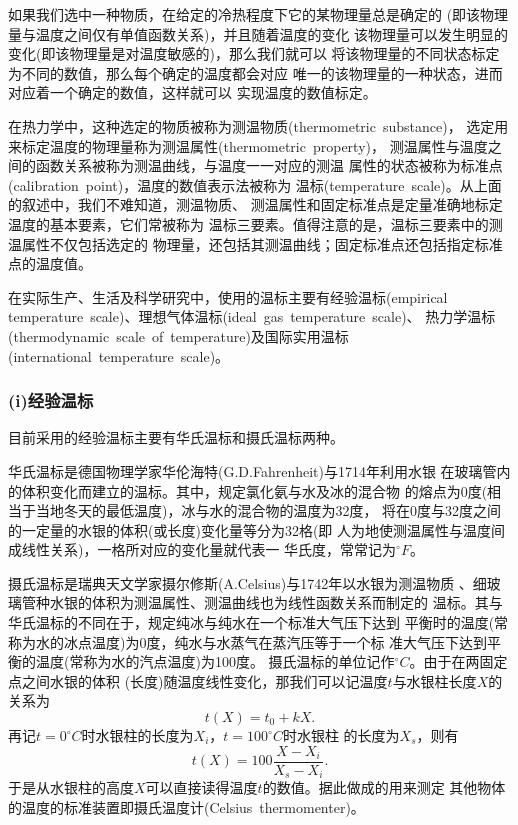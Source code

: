 \begin{definition}
    如果我们选中一种物质，在给定的冷热程度下它的某物理量总是确定的
    (即该物理量与温度之间仅有单值函数关系)，并且随着温度的变化
    该物理量可以发生明显的变化(即该物理量是对温度敏感的)，那么我们就可以
    将该物理量的不同状态标定为不同的数值，那么每个确定的温度都会对应
    唯一的该物理量的一种状态，进而对应着一个确定的数值，这样就可以
    实现温度的数值标定。
    
    在热力学中，这种选定的物质被称为测温物质(thermometric~substance)，
    选定用来标定温度的物理量称为测温属性(thermometric~property)，
    测温属性与温度之间的函数关系被称为测温曲线，与温度一一对应的测温
    属性的状态被称为标准点(calibration~point)，温度的数值表示法被称为
    温标(temperature~scale)。从上面的叙述中，我们不难知道，测温物质、
    测温属性和固定标准点是定量准确地标定温度的基本要素，它们常被称为
    温标三要素。值得注意的是，温标三要素中的测温属性不仅包括选定的
    物理量，还包括其测温曲线；固定标准点还包括指定标准点的温度值。
\end{definition}

在实际生产、生活及科学研究中，使用的温标主要有经验温标(empirical~
temperature~scale)、理想气体温标(ideal~gas~temperature~scale)、
热力学温标(thermodynamic~scale~of~temperature)及国际实用温标
(international~temperature~scale)。

\subsubsection{(i)经验温标}

目前采用的经验温标主要有华氏温标和摄氏温标两种。

华氏温标是德国物理学家华伦海特(G.D.Fahrenheit)与1714年利用水银
在玻璃管内的体积变化而建立的温标。其中，规定氯化氨与水及冰的混合物
的熔点为0度(相当于当地冬天的最低温度)，冰与水的混合物的温度为32度，
将在0度与32度之间的一定量的水银的体积(或长度)变化量等分为32格(即 
人为地使测温属性与温度间成线性关系)，一格所对应的变化量就代表一
华氏度，常常记为$^{\circ}F$。

摄氏温标是瑞典天文学家摄尔修斯(A.Celsius)与1742年以水银为测温物质
、细玻璃管种水银的体积为测温属性、测温曲线也为线性函数关系而制定的
温标。其与华氏温标的不同在于，规定纯冰与纯水在一个标准大气压下达到
平衡时的温度(常称为水的冰点温度)为0度，纯水与水蒸气在蒸汽压等于一个标
准大气压下达到平衡的温度(常称为水的汽点温度)为100度。
摄氏温标的单位记作$^{\circ}C$。由于在两固定点之间水银的体积
(长度)随温度线性变化，那我们可以记温度$t$与水银柱长度$X$的关系为
\begin{equation}
    t(X)=t_0+kX.
\end{equation}
再记$t=0^{\circ}C$时水银柱的长度为$X_i$，$t=100^{\circ}C$时水银柱 
的长度为$X_s$，则有
\begin{equation}
    t(X)=100\frac{X-X_i}{X_s-X_i}.
\end{equation}
于是从水银柱的高度$X$可以直接读得温度$t$的数值。据此做成的用来测定
其他物体的温度的标准装置即摄氏温度计(Celsius~thermomenter)。

